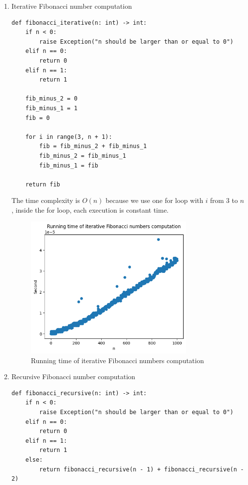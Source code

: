 \documentclass[10pt]{article}
\begin{document}
\begin{enumerate}
  \item {Iterative Fibonacci number computation

        \begin{verbatim}
def fibonacci_iterative(n: int) -> int:
    if n < 0:
        raise Exception("n should be larger than or equal to 0")
    elif n == 0:
        return 0
    elif n == 1:
        return 1

    fib_minus_2 = 0
    fib_minus_1 = 1
    fib = 0

    for i in range(3, n + 1):
        fib = fib_minus_2 + fib_minus_1
        fib_minus_2 = fib_minus_1
        fib_minus_1 = fib

    return fib
            \end{verbatim}

        The time complexity is $O(n)$ because we use one for loop with $i$ from $3$ to $n$, inside the for loop, each execution is constant time.


        \begin{figure}[H]
          \centering
          \includegraphics[width=0.8\textwidth]{../assets/runtimes_iterative.png}
          \caption{Running time of iterative Fibonacci numbers computation}
        \end{figure}
        }
  \item {Recursive Fibonacci number computation
        \begin{verbatim}
def fibonacci_recursive(n: int) -> int:
    if n < 0:
        raise Exception("n should be larger than or equal to 0")
    elif n == 0:
        return 0
    elif n == 1:
        return 1
    else:
        return fibonacci_recursive(n - 1) + fibonacci_recursive(n - 2)
            \end{verbatim}



}
\end{enumerate}
\end{document}
